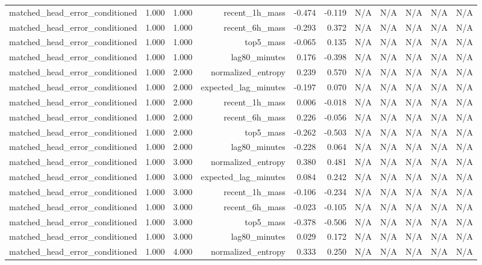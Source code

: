 \begin{table}[h!]
\begin{tabular}{lrrrrrrrrrr}
matched\_head\_error\_conditioned & 1.000 & 1.000 & recent\_1h\_mass & -0.474 & -0.119 & N/A & N/A & N/A & N/A & N/A \\
matched\_head\_error\_conditioned & 1.000 & 1.000 & recent\_6h\_mass & -0.293 & 0.372 & N/A & N/A & N/A & N/A & N/A \\
matched\_head\_error\_conditioned & 1.000 & 1.000 & top5\_mass & -0.065 & 0.135 & N/A & N/A & N/A & N/A & N/A \\
matched\_head\_error\_conditioned & 1.000 & 1.000 & lag80\_minutes & 0.176 & -0.398 & N/A & N/A & N/A & N/A & N/A \\
matched\_head\_error\_conditioned & 1.000 & 2.000 & normalized\_entropy & 0.239 & 0.570 & N/A & N/A & N/A & N/A & N/A \\
matched\_head\_error\_conditioned & 1.000 & 2.000 & expected\_lag\_minutes & -0.197 & 0.070 & N/A & N/A & N/A & N/A & N/A \\
matched\_head\_error\_conditioned & 1.000 & 2.000 & recent\_1h\_mass & 0.006 & -0.018 & N/A & N/A & N/A & N/A & N/A \\
matched\_head\_error\_conditioned & 1.000 & 2.000 & recent\_6h\_mass & 0.226 & -0.056 & N/A & N/A & N/A & N/A & N/A \\
matched\_head\_error\_conditioned & 1.000 & 2.000 & top5\_mass & -0.262 & -0.503 & N/A & N/A & N/A & N/A & N/A \\
matched\_head\_error\_conditioned & 1.000 & 2.000 & lag80\_minutes & -0.228 & 0.064 & N/A & N/A & N/A & N/A & N/A \\
matched\_head\_error\_conditioned & 1.000 & 3.000 & normalized\_entropy & 0.380 & 0.481 & N/A & N/A & N/A & N/A & N/A \\
matched\_head\_error\_conditioned & 1.000 & 3.000 & expected\_lag\_minutes & 0.084 & 0.242 & N/A & N/A & N/A & N/A & N/A \\
matched\_head\_error\_conditioned & 1.000 & 3.000 & recent\_1h\_mass & -0.106 & -0.234 & N/A & N/A & N/A & N/A & N/A \\
matched\_head\_error\_conditioned & 1.000 & 3.000 & recent\_6h\_mass & -0.023 & -0.105 & N/A & N/A & N/A & N/A & N/A \\
matched\_head\_error\_conditioned & 1.000 & 3.000 & top5\_mass & -0.378 & -0.506 & N/A & N/A & N/A & N/A & N/A \\
matched\_head\_error\_conditioned & 1.000 & 3.000 & lag80\_minutes & 0.029 & 0.172 & N/A & N/A & N/A & N/A & N/A \\
matched\_head\_error\_conditioned & 1.000 & 4.000 & normalized\_entropy & 0.333 & 0.250 & N/A & N/A & N/A & N/A & N/A \\

\end{tabular}
\end{table}
